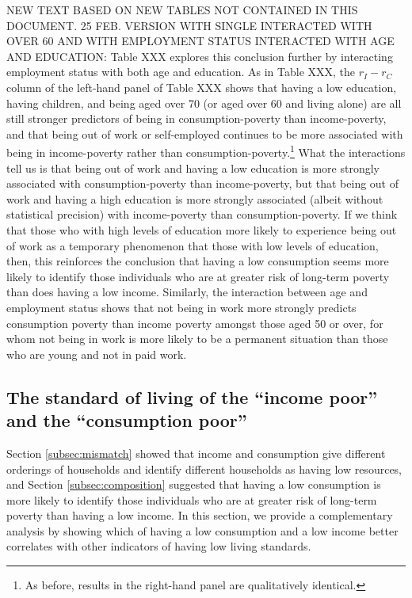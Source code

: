 NEW TEXT BASED ON NEW TABLES NOT CONTAINED IN THIS DOCUMENT. 25 FEB.  VERSION WITH SINGLE INTERACTED WITH OVER 60 AND WITH EMPLOYMENT STATUS INTERACTED WITH AGE AND EDUCATION: Table XXX explores this conclusion further by interacting employment status with both age and education. As in Table XXX, the $r_{I}-r_{C}$ column of the left-hand panel of Table XXX shows that having a low education, having children, and being aged over 70 (or aged over 60 and living alone) are all still stronger predictors of being in consumption-poverty than income-poverty, and that being out of work or self-employed continues to be more associated with being in income-poverty rather than consumption-poverty.\footnote{As before, results in the right-hand panel are qualitatively identical.} What the interactions tell us is that being out of work and having a low education is more strongly associated with consumption-poverty than income-poverty, but that being out of work and having a high education is more strongly associated (albeit without statistical precision) with income-poverty than consumption-poverty. If we think that those who with high levels of education more likely to experience being out of work as a temporary phenomenon that those with low levels of education, then, this reinforces the conclusion that having a low consumption seems more likely to identify those individuals who are at greater risk of long-term poverty than does having a low income. Similarly, the interaction between age and employment status shows that not being in work more strongly predicts consumption poverty than income poverty amongst those aged 50 or over, for whom not being in work is more likely to be a permanent situation than those who are young and not in paid work. 


\subsection{The standard of living of the ``income poor'' and the ``consumption poor''}\label{subsec:DiDs}

Section \ref{subsec:mismatch} showed that income and consumption give different orderings of households and identify different households as having low resources, and 
Section \ref{subsec:composition} suggested that having a low consumption is more likely to identify those individuals who are at greater risk of long-term poverty than having a low income. In this section, we provide a complementary analysis by showing which of having a low consumption and a low income better correlates with other indicators of having low living standards. 

